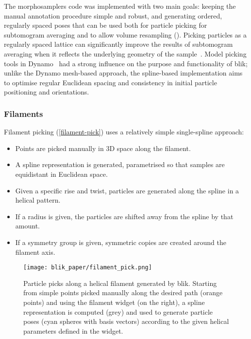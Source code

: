 The morphosamplers code was implemented with two main goals: keeping the manual annotation procedure simple and robust, and generating ordered, regularly spaced poses that can be used both for particle picking for subtomogram averaging and to allow volume resampling (). Picking particles as a regularly spaced lattice can significantly improve the results of subtomogram averaging when it reflects the underlying geometry of the sample~\cite{castano-diezDynamoCatalogueGeometrical2017,burtFlexibleFrameworkMultiparticle2021}. Model picking tools in Dynamo~\cite{castano-diezDynamoFlexibleUserfriendly2012} had a strong influence on the purpose and functionality of blik; unlike the Dynamo mesh-based approach, the spline-based implementation aims to optimise regular Euclidean spacing and consistency in initial particle positioning and orientations.

\subsubsection{Filaments}
Filament picking (\autoref{filament-pick}) uses a relatively simple single-spline approach:

\begin{itemize}[noitemsep]
    \item Points are picked manually in 3D space along the filament.
    \item A spline representation is generated, parametrised so that samples are equidistant in Euclidean space.
    \item Given a specific rise and twist, particles are generated along the spline in a helical pattern.
    \item If a radius is given, the particles are shifted away from the spline by that amount.
    \item If a symmetry group is given, symmetric copies are created around the filament axis.
\end{itemize}

\begin{figure}[!ht]
    \centering
    \texttt{[image: blik\_paper/filament\_pick.png]}
    \caption[Filament-based particle picking]{Particle picks along a helical filament generated by blik. Starting from simple points picked manually along the desired path (orange points) and using the filament widget (on the right), a spline representation is computed (grey) and used to generate particle poses (cyan spheres with basis vectors) according to the given helical parameters defined in the widget.}
    \label{filament-pick}
\end{figure}

